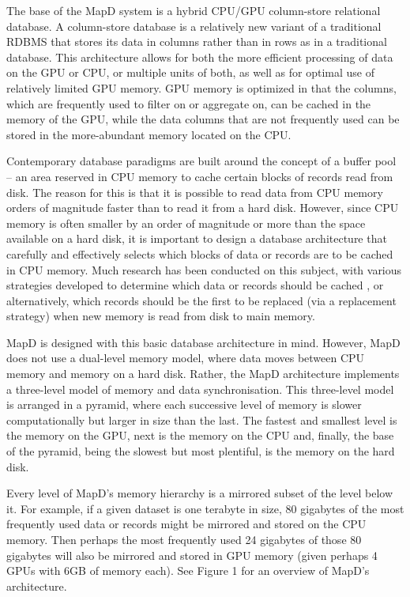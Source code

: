 \documentclass[twocolumn]{article}
\begin{document}
The base of the MapD system is a hybrid CPU/GPU column-store relational database. A column-store database is a relatively new variant of a traditional RDBMS that stores its data in columns rather than in rows as in a traditional database. This architecture allows for both the more efficient processing of data on the GPU or CPU, or multiple units of both, as well as for optimal use of relatively limited GPU memory. GPU memory is optimized in that the columns, which are frequently used to filter on or aggregate on, can be cached in the memory of the GPU, while the data columns that are not frequently used can be stored in the more-abundant memory located on the CPU.

Contemporary database paradigms are built around the concept of a buffer pool – an area reserved in CPU memory to cache certain blocks of records read from disk. The reason for this is that it is possible to read data from CPU memory orders of magnitude faster than to read it from a hard disk. However, since CPU memory is often smaller by an order of magnitude or more than the space available on a hard disk, it is important to design a database architecture that carefully and effectively selects which blocks of data or records are to be cached in CPU memory. Much research has been conducted on this subject, with various strategies developed to determine which data or records should be cached , or alternatively, which records should be the first to be replaced (via a replacement strategy) when new memory is read from disk to main memory.

MapD is designed with this basic database architecture in mind. However, MapD does not use a dual-level memory model, where data moves between CPU memory and memory on a hard disk. Rather, the MapD architecture implements a three-level model of memory and data synchronisation. This three-level model is arranged in a pyramid, where each successive level of memory is slower computationally but larger in size than the last. The fastest and smallest level is the memory on the GPU, next is the memory on the CPU and, finally, the base of the pyramid, being the slowest but most plentiful, is the memory on the hard disk.

Every level of MapD’s memory hierarchy is a mirrored subset of the level below it. For example, if a given dataset is one terabyte in size, 80 gigabytes of the most frequently used data or records might be mirrored and stored on the CPU memory. Then perhaps the most frequently used 24 gigabytes of those 80 gigabytes will also be mirrored and stored in GPU memory (given perhaps 4 GPUs with 6GB of memory each). See Figure 1 for an overview of MapD’s architecture.
\end{document}
